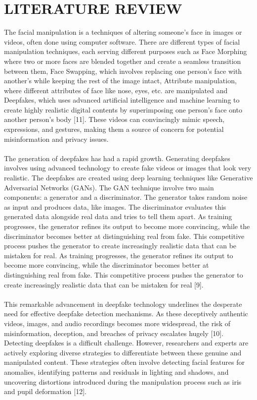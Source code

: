 \section{LITERATURE REVIEW}

The facial manipulation is a techniques of altering someone's face in images or videos, often done using computer software. There are different types of facial manipulation techniques, each serving different purposes such as Face Morphing where two or more faces are blended together and create a seamless transition between them, Face Swapping, which involves replacing one person's face with another's while keeping the rest of the image intact, Attribute manipulation, where different attributes of face like nose, eyes, etc. are manipulated and Deepfakes, which uses advanced artificial intelligence and machine learning to create highly realistic digital contents by superimposing one person's face onto another person's body [11]. These videos can convincingly mimic speech, expressions, and gestures, making them a source of concern for potential misinformation and privacy issues.
\\\\
The generation of deepfakes has had a rapid growth. Generating deepfakes involves using advanced technology to create fake videos or images that look very realistic. The deepfakes are created using deep learning techniques like Generative Adversarial Networks (GANs). The GAN technique involve two main components: a generator and a discriminator. The generator takes random noise as input and produces data, like images. The discriminator evaluates this generated data alongside real data and tries to tell them apart. As training progresses, the generator refines its output to become more convincing, while the discriminator becomes better at distinguishing real from fake. This competitive process pushes the generator to create increasingly realistic data that can be mistaken for real. As training progresses, the generator refines its output to become more convincing, while the discriminator becomes better at distinguishing real from fake. This competitive process pushes the generator to create increasingly realistic data that can be mistaken for real [9]. 
\\\\
This remarkable advancement in deepfake technology underlines the desperate need for effective deepfake detection mechanisms. As these deceptively authentic videos, images, and audio recordings becomes more widespread, the risk of misinformation, deception, and breaches of privacy escalates hugely [10]. Detecting deepfakes is a difficult challenge. However, researchers and experts are actively exploring diverse strategies to differentiate between these genuine and manipulated content. These strategies often involve detecting facial features for anomalies, identifying patterns and residuals in lighting and shadows, and uncovering distortions introduced during the manipulation process such as iris and pupil deformation [12].
